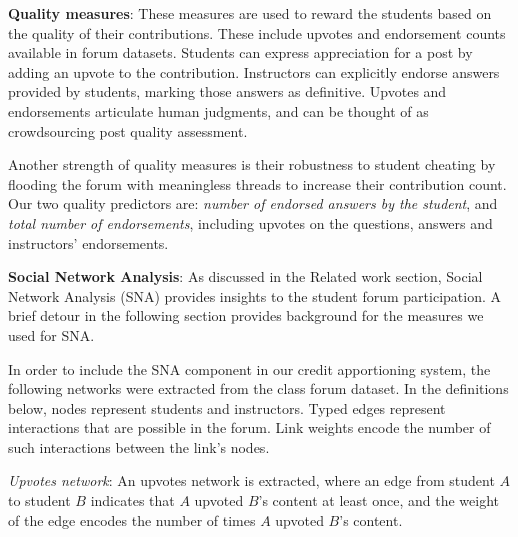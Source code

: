    
\textbf{Quality measures}: These measures are used to reward the
students based on the quality of their contributions. These include upvotes and endorsement counts available in forum
datasets. Students can express appreciation for a post by adding an
upvote to the contribution. Instructors can explicitly endorse answers
provided by students, marking those answers as definitive. Upvotes and
endorsements articulate human judgments, and can be thought of as
crowdsourcing post quality assessment.

Another strength of quality measures is their robustness to
student cheating by flooding the forum with meaningless threads to
increase their contribution count.  Our two quality predictors are:
\emph{number of endorsed answers by the student}, and
\emph{total number of endorsements}, including upvotes on the questions,
answers and instructors' endorsements.


\textbf{Social Network Analysis}: As discussed in the Related work section, Social Network Analysis (SNA) provides insights to the student forum participation.  A brief detour in the following section provides
background for the measures we used for SNA.

In order to include
the SNA component in our credit apportioning
system, the following networks were extracted from the class forum
dataset. In the definitions below, nodes represent students and instructors. Typed edges
represent interactions that are possible in the forum. Link weights
encode the number of such interactions between the link's nodes.

\emph{Upvotes network}: An upvotes network is extracted, where an edge
from student $A$ to student $B$ indicates that $A$ upvoted $B$'s content at
least once, and the weight of the edge encodes the number of times $A$
upvoted $B$'s content.

